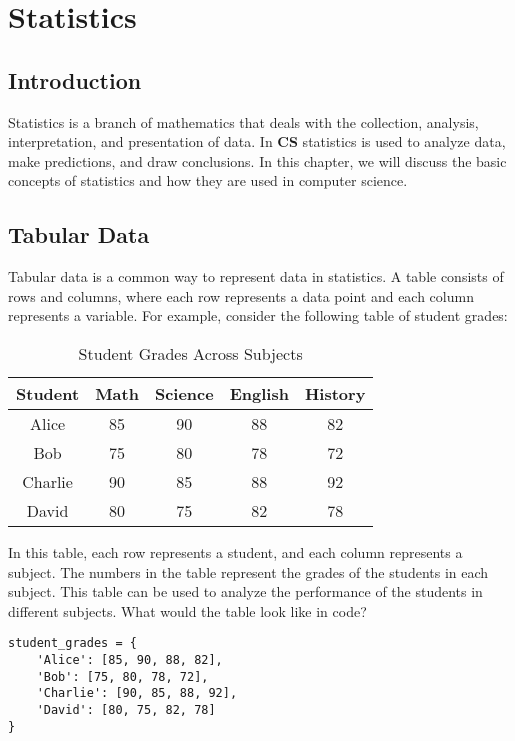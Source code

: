 \chapter{Statistics}\label{chap:statistics}

\section{Introduction}

Statistics is a branch of mathematics that deals with the collection, analysis, interpretation, and presentation of data. In \textbf{CS} statistics is used to analyze data, make predictions, and draw conclusions. In this chapter, we will discuss the basic concepts of statistics and how they are used in computer science.

\section{Tabular Data}

Tabular data is a common way to represent data in statistics. A table consists of rows and columns, where each row represents a data point and each column represents a variable. For example, consider the following table of student grades:

\begin{table}[H]
\centering
\caption{Student Grades Across Subjects}
\begin{tabular}{|c|c|c|c|c|}
\hline
\textbf{Student} & \textbf{Math} & \textbf{Science} & \textbf{English} & \textbf{History} \\
\hline
Alice    & 85  & 90  & 88  & 82 \\
Bob      & 75  & 80  & 78  & 72 \\
Charlie  & 90  & 85  & 88  & 92 \\
David    & 80  & 75  & 82  & 78 \\
\hline
\end{tabular}\label{tab:student-grades}
\end{table}

In this table, each row represents a student, and each column represents a subject. The numbers in the table represent the grades of the students in each subject. This table can be used to analyze the performance of the students in different subjects. What would the table look like in code?
\newpage

\begin{lstlisting}[caption={Student Grades Across Subjects in Python}, label={lst:student-grades}]
student_grades = {
    'Alice': [85, 90, 88, 82],
    'Bob': [75, 80, 78, 72],
    'Charlie': [90, 85, 88, 92],
    'David': [80, 75, 82, 78]
}
\end{lstlisting}

